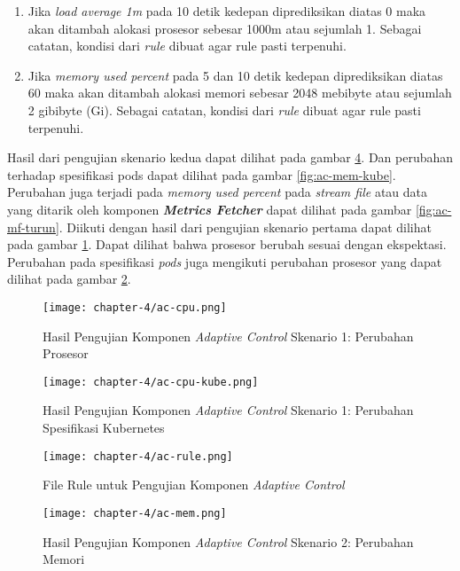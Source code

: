 \begin{enumerate}
    \item Jika \textit{load average 1m} pada 10 detik kedepan diprediksikan diatas 0 maka akan ditambah alokasi prosesor sebesar 1000m atau sejumlah 1. Sebagai catatan, kondisi dari \textit{rule} dibuat agar rule pasti terpenuhi.
    \item Jika \textit{memory used percent} pada 5 dan 10 detik kedepan diprediksikan diatas 60 maka akan ditambah alokasi memori sebesar 2048 mebibyte atau sejumlah 2 gibibyte (Gi). Sebagai catatan, kondisi dari \textit{rule} dibuat agar rule pasti terpenuhi.
\end{enumerate}

Hasil dari pengujian skenario kedua dapat dilihat pada gambar \ref{fig:ac-mem}. Dan perubahan terhadap spesifikasi pods dapat dilihat pada gambar \ref{fig:ac-mem-kube}. Perubahan juga terjadi pada \textit{memory used percent} pada \textit{stream file} atau data yang ditarik oleh komponen \textbf{\textit{Metrics Fetcher}} dapat dilihat pada gambar \ref{fig:ac-mf-turun}.
Diikuti dengan hasil dari pengujian skenario pertama dapat dilihat pada gambar \ref{fig:ac-cpu}. Dapat dilihat bahwa prosesor berubah sesuai dengan ekspektasi. Perubahan pada spesifikasi \textit{pods} juga mengikuti perubahan prosesor yang dapat dilihat pada gambar \ref{fig:ac-cpu-kube}.

\begin{figure}[h]
    \centering
    \texttt{[image: chapter-4/ac-cpu.png]}
    \caption{Hasil Pengujian Komponen \textit{Adaptive Control} Skenario 1: Perubahan Prosesor}
    \label{fig:ac-cpu}
\end{figure}

\begin{figure}[h]
    \centering
    \texttt{[image: chapter-4/ac-cpu-kube.png]}
    \caption{Hasil Pengujian Komponen \textit{Adaptive Control} Skenario 1: Perubahan Spesifikasi Kubernetes}
    \label{fig:ac-cpu-kube}
\end{figure}

\begin{figure}[h]
    \centering
    \texttt{[image: chapter-4/ac-rule.png]}
    \caption{File Rule untuk Pengujian Komponen \textit{Adaptive Control}}
    \label{fig:ac-rule}
\end{figure}

\begin{figure}[h]
    \centering
    \texttt{[image: chapter-4/ac-mem.png]}
    \caption{Hasil Pengujian Komponen \textit{Adaptive Control} Skenario 2: Perubahan Memori}
    \label{fig:ac-mem}
\end{figure}

